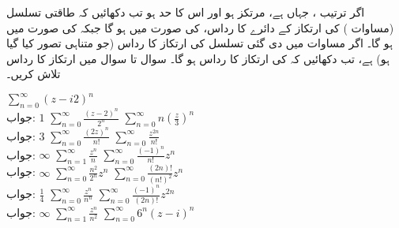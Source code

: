 \quad
اگر ترتیب ، جہاں  ہے، مرتکز ہو اور اس کا حد  ہو تب دکھائیں کہ طاقتی تسلسل (مساوات ) کی ارتکاز کے دائرے کا رداس،  کی صورت میں   ہو گا جبکہ  کی صورت میں  ہو گا۔
\quad
اگر مساوات  میں دی گئی تسلسل کی ارتکاز کا رداس (جو متناہی تصور  کیا گیا ہو)  ہے، تب دکھائیں کہ  کی ارتکاز کا رداس  ہو گا۔
سوال  تا سوال  میں ارتکاز کا رداس تلاش کریں۔

\quad
$\sum\limits_{n=0}^{\infty} (z-i2)^n$\\
جواب:\quad
$1$
\quad
$\sum\limits_{n=0}^{\infty} \tfrac{(z-2)^n}{2^n}$
\quad
$\sum\limits_{n=0}^{\infty} n(\tfrac{z}{3})^n$\\
جواب:\quad
$3$
\quad
$\sum\limits_{n=0}^{\infty} \tfrac{(2z)^n}{n!}$
\quad
$\sum\limits_{n=0}^{\infty} \tfrac{z^{2n}}{n!}$\\
جواب:\quad
$\infty$
\quad
$\sum\limits_{n=1}^{\infty} \tfrac{z^n}{n}$
\quad
$\sum\limits_{n=0}^{\infty} \tfrac{(-1)^n}{n!}z^n$\\
جواب:\quad
$\infty$
\quad
$\sum\limits_{n=0}^{\infty} \tfrac{n^2}{2^n}z^n$
\quad
$\sum\limits_{n=0}^{\infty} \tfrac{(2n)!}{(n!)^2}z^n$\\
جواب:\quad
$\tfrac{1}{4}$
\quad
$\sum\limits_{n=0}^{\infty} \tfrac{z^n}{n^n}$
\quad
$\sum\limits_{n=0}^{\infty} \tfrac{(-1)^n}{(2n)!}z^{2n}$\\
جواب:\quad
$\infty$
\quad
$\sum\limits_{n=1}^{\infty} \tfrac{z^n}{n^2}$
\quad
$\sum\limits_{n=0}^{\infty} 6^n(z-i)^n$\\
